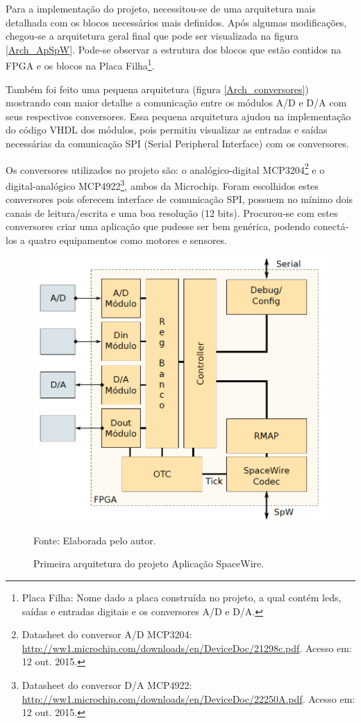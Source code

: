 Para a implementação do projeto, necessitou-se de uma arquitetura mais detalhada com os blocos necessários mais definidos. Após algumas modificações, chegou-se a arquitetura geral final que pode ser visualizada na figura \ref{Arch_ApSpW}. Pode-se observar a estrutura dos blocos que estão contidos na FPGA e os blocos na Placa Filha\footnote{Placa Filha: Nome dado a placa construída no projeto, a qual contém leds, saídas e entradas digitais e os conversores A/D e D/A.}.

Também foi feito uma pequena arquitetura (figura \ref{Arch_conversores}) mostrando com maior detalhe a comunicação entre os módulos A/D e D/A com seus respectivos conversores. Essa pequena arquitetura ajudou na implementação do código VHDL dos módulos, pois permitiu visualizar as entradas e saídas necessárias da comunicação SPI (Serial Peripheral Interface) com os conversores.

Os conversores utilizados no projeto são: o analógico-digital MCP3204\footnote{\label{MCP3204}Datasheet do conversor A/D MCP3204: \url{http://ww1.microchip.com/downloads/en/DeviceDoc/21298c.pdf}. Acesso em: 12 out. 2015.} e o digital-analógico MCP4922\footnote{\label{MCP4922}Datasheet do conversor D/A MCP4922: \url{http://ww1.microchip.com/downloads/en/DeviceDoc/22250A.pdf}. Acesso em: 12 out. 2015.}, ambos da Microchip. Foram escolhidos estes conversores pois oferecem interface de comunicação SPI, possuem no mínimo dois canais de leitura/escrita e uma boa resolução (12 bits). Procurou-se com estes conversores criar uma aplicação que pudesse ser bem genérica, podendo conectá-los a quatro equipamentos como motores e sensores.

\begin{figure}[!htb]
	\centering
	\caption{Primeira arquitetura do projeto Aplicação SpaceWire.}
	\includegraphics[scale = 0.5]{Imagens/Arch_1.png}
	
	Fonte: Elaborada pelo autor.
	
	\label{Arch_1}
\end{figure}

